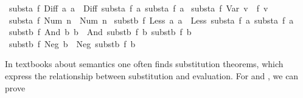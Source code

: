 \begin{isabellebody}
{}\ {}substa\ f\ {}Diff\ a{}\ a{}{}\ {}\ Diff\ {}substa\ f\ a{}{}\ {}substa\ f\ a{}{}{}\isanewline
{}\ {}substa\ f\ {}Var\ v{}\ {}\ f\ v{}\isanewline
{}\ {}substa\ f\ {}Num\ n{}\ {}\ Num\ n{}\isanewline
{}\ {}substb\ f\ {}Less\ a{}\ a{}{}\ {}\ Less\ {}substa\ f\ a{}{}\ {}substa\ f\ a{}{}{}\isanewline
{}\ {}substb\ f\ {}And\ b{}\ b{}{}\ {}\ And\ {}substb\ f\ b{}{}\ {}substb\ f\ b{}{}{}\isanewline
{}\ {}substb\ f\ {}Neg\ b{}\ {}\ Neg\ {}substb\ f\ b{}{}%
\begin{isamarkuptext}%
In textbooks about semantics one often finds substitution
  theorems, which express the relationship between substitution and
  evaluation.  For  and , we can prove

\end{isamarkuptext}
\end{isabellebody}
